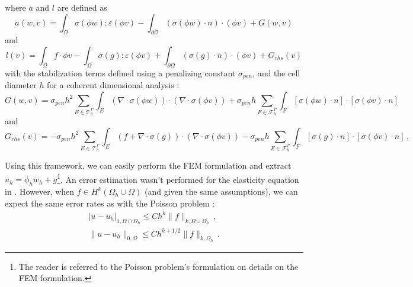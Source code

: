 where $a$ and $l$ are defined as 
$$
a(w,v) = \int_{\Omega} \sigma(\phi w) : \varepsilon(\phi v) - \int_{\partial\Omega} (\sigma(\phi w) \cdot n) \cdot (\phi v) + G(w,v)
$$
and
$$
l(v) = \int_{\Omega} f \cdot \phi v - \int_{\Omega} \sigma(g) : \varepsilon(\phi v) + \int_{\partial\Omega} (\sigma(g) \cdot n) \cdot (\phi v) + G_{rhs}(v)
$$
with the stabilization terms defined using a penalizing constant $\sigma_{pen}$, and the cell diameter $h$ for a coherent dimensional analysis :
$$
G(w,v) = \sigma_{pen} h^2 \sum_{E \in \mathcal{T}_h^{\Gamma}} \int_{E} \left(\nabla \cdot \sigma(\phi w)\right) \cdot \left( \nabla \cdot \sigma(\phi v)\right) + \sigma_{pen} h \sum_{F \in \mathcal{F}_h^{\Gamma}} \int_{F} \left[\sigma(\phi w) \cdot n \right] \cdot \left[ \sigma(\phi v) \cdot n \right] 
$$ 
and 
$$
G_{rhs}(v) = - \sigma_{pen} h^2 \sum_{E \in \mathcal{T}_h^{\Gamma}} \int_{E} \left( f + \nabla \cdot \sigma(g) \right) \cdot \left( \nabla \cdot \sigma(\phi v)\right) - \sigma_{pen} h \sum_{F \in \mathcal{F}_h^{\Gamma}} \int_{F} \left[\sigma(g) \cdot n \right] \cdot \left[ \sigma(\phi v) \cdot n \right] \,.
$$

Using this framework, we can easily perform the FEM formulation and extract $u_h = \phi_h w_h + g$\footnote{The reader is referred to the Poisson problem's \phifem formulation on details on the FEM formulation.}. An error estimation wasn't performed for the elasticity equation in \parencite{Reference3}. However, when $f\in H^k(\Omega_h\cup\Omega)$ (and given the same assumptions), we can expect the same error rates as with the Poisson problem :  
\begin{align}
    | u - u_h|_{1, \Omega\cap\Omega_h} \le Ch^k \|f \|_{k, \Omega\cup\Omega_h} \,, \\
    \| u - u_h\|_{0, \Omega} \le Ch^{k+1/2} \|f \|_{k, \Omega_h} \,.
\end{align}	


